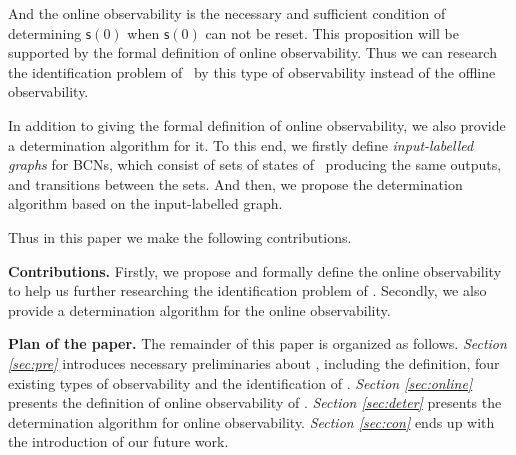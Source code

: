   And the online observability is the necessary and sufficient condition of determining $\mathsf{s}(0)$ when $\mathsf{s}(0)$ can not be reset. This proposition will be supported by the formal definition of  online observability.  Thus we can research the identification problem of \BCNs\ by this type of observability instead of the offline observability.




In addition to giving the formal definition of online observability, we also provide a determination algorithm for it. To this end, we firstly define {\em input-labelled graphs} for BCNs, which consist of sets of states of \BCNs\ producing the same outputs, and transitions between the sets. And then, we propose the determination algorithm based on the input-labelled graph.

Thus in this paper we make the following contributions.

\medskip\noindent
{\bf Contributions.}
Firstly, we propose and formally define the online observability to help us further researching the identification problem of \BCNs. %
Secondly, we also provide a determination algorithm for the online observability. %

\medskip\noindent
{\bf Plan of the paper.}
The remainder of this paper is organized as follows.
 {\em Section \ref{sec:pre}} introduces necessary preliminaries about \BCNs, including the definition, four existing types of observability and the identification of \BCNs. {\em Section \ref{sec:online}} presents the definition of online observability of \BCNs. {\em Section \ref{sec:deter}} presents the determination algorithm for online observability. 
 {\em Section \ref{sec:con}} ends up with the introduction of our future work.

